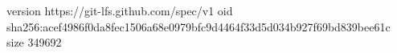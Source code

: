 version https://git-lfs.github.com/spec/v1
oid sha256:acef4986f0da8fec1506a68e0979bfc9d4464f33d5d034b927f69bd839bee61c
size 349692
